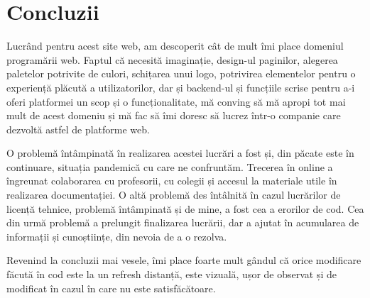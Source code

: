 \documentclass[12pt,a4paper]{report}
\begin{document}
\section{Concluzii}
\par
Lucrând pentru acest site web, am descoperit cât de mult îmi place domeniul programării web. Faptul că necesită imaginație, design-ul paginilor, alegerea paletelor potrivite de culori, schițarea unui logo, potrivirea elementelor pentru o experiență plăcută a utilizatorilor, dar și backend-ul și funcțiile scrise pentru a-i oferi platformei un scop și o funcționalitate, mă conving să mă apropi tot mai mult de acest domeniu și mă fac să îmi doresc să lucrez într-o companie care dezvoltă astfel de platforme web. 
\\ \par
O problemă întâmpinată în realizarea acestei lucrări a fost și, din păcate este în continuare, situația pandemică cu care ne confruntăm. Trecerea în online a îngreunat colaborarea cu profesorii, cu colegii și accesul la materiale utile în realizarea documentației. O altă problemă des întâlnită în cazul lucrărilor de licență tehnice, problemă întâmpinată și de mine, a fost cea a erorilor de cod. Cea din urmă problemă a prelungit finalizarea lucrării, dar a ajutat în acumularea de informații și cunoștiințe, din nevoia de a o rezolva.
\\ \par
Revenind la concluzii mai vesele, îmi place foarte mult gândul că orice modificare făcută în cod este la un refresh distanță, este vizuală, ușor de observat și de modificat în cazul în care nu este satisfăcătoare.
\end{document}
